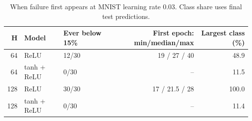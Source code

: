 \begin{table}[htbp]
\centering
\caption{When failure first appears at MNIST learning rate 0.03. Class share uses final test predictions.}
\label{tab:onset}
\footnotesize
\begin{tabular}{@{}rllrr@{}}
\toprule
H & Model & Ever below 15\% & First epoch: min/median/max & Largest class (\%) \\
\midrule
64 & ReLU & 12/30 & 19 / 27 / 40 & 48.9 \\
64 & tanh + ReLU & 0/30 & -- & 11.5 \\
128 & ReLU & 30/30 & 17 / 21.5 / 28 & 100.0 \\
128 & tanh + ReLU & 0/30 & -- & 11.4 \\
\bottomrule
\end{tabular}
\end{table}
